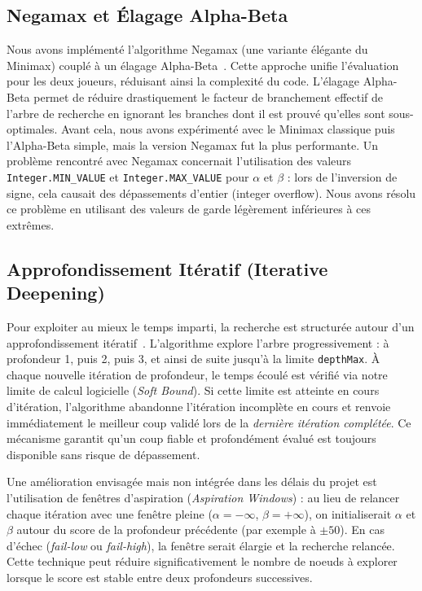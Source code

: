 \documentclass[12pt,a4paper]{article}
\begin{document}
\subsection{Negamax et Élagage Alpha-Beta}
Nous avons implémenté l'algorithme Negamax (une variante élégante du Minimax) couplé à un élagage Alpha-Beta~\cite{cp_alphabeta, knuth1975}. Cette approche unifie l'évaluation pour les deux joueurs, réduisant ainsi la complexité du code. L'élagage Alpha-Beta permet de réduire drastiquement le facteur de branchement effectif de l'arbre de recherche en ignorant les branches dont il est prouvé qu'elles sont sous-optimales.
Avant cela, nous avons expérimenté avec le Minimax classique puis l'Alpha-Beta simple, mais la version Negamax fut la plus performante. Un problème rencontré avec Negamax concernait l'utilisation des valeurs \texttt{Integer.MIN\_VALUE} et \texttt{Integer.MAX\_VALUE} pour $\alpha$ et $\beta$ : lors de l'inversion de signe, cela causait des dépassements d'entier (integer overflow). Nous avons résolu ce problème en utilisant des valeurs de garde légèrement inférieures à ces extrêmes.


\subsection{Approfondissement Itératif (Iterative Deepening)}
Pour exploiter au mieux le temps imparti, la recherche est structurée autour d'un approfondissement itératif~\cite{cp_iterative_deepening}. L'algorithme explore l'arbre progressivement : à profondeur 1, puis 2, puis 3, et ainsi de suite jusqu'à la limite \texttt{depthMax}. 
À chaque nouvelle itération de profondeur, le temps écoulé est vérifié via notre limite de calcul logicielle (\textit{Soft Bound}). Si cette limite est atteinte en cours d'itération, l'algorithme abandonne l'itération incomplète en cours et renvoie immédiatement le meilleur coup validé lors de la \textit{dernière itération complétée}. Ce mécanisme garantit qu'un coup fiable et profondément évalué est toujours disponible sans risque de dépassement.

Une amélioration envisagée mais non intégrée dans les délais du projet est l'utilisation de fenêtres d'aspiration (\textit{Aspiration Windows}) : au lieu de relancer chaque itération avec une fenêtre pleine ($\alpha = -\infty$, $\beta = +\infty$), on initialiserait $\alpha$ et $\beta$ autour du score de la profondeur précédente (par exemple à $\pm 50$). En cas d'échec (\textit{fail-low} ou \textit{fail-high}), la fenêtre serait élargie et la recherche relancée. Cette technique peut réduire significativement le nombre de noeuds à explorer lorsque le score est stable entre deux profondeurs successives.
\end{document}
